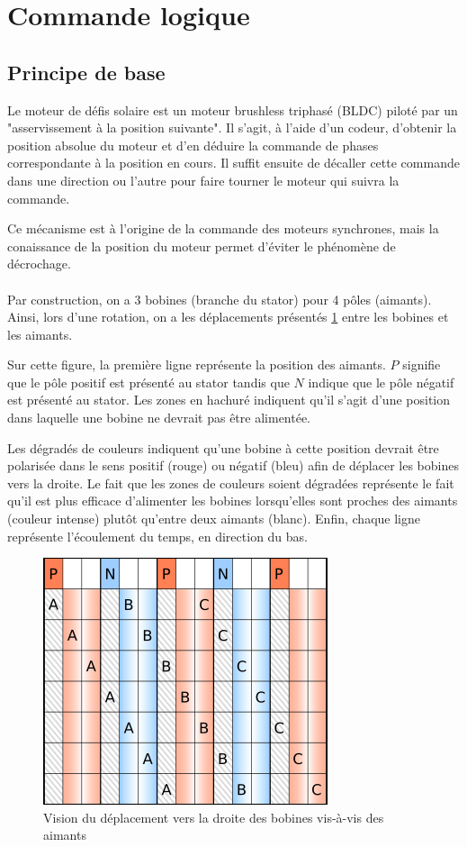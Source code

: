 \section{Commande logique}
\subsection{Principe de base}
\label{seq:cmd_principes_base}
Le moteur de défis solaire est un moteur brushless triphasé (BLDC) piloté par un "asservissement à la position suivante".
Il s'agit, à l'aide d'un codeur, d'obtenir la position absolue du moteur et d'en déduire la commande de phases correspondante à la position en cours.
Il suffit ensuite de décaller cette commande dans une direction ou l'autre pour faire tourner le moteur qui suivra la commande.

Ce mécanisme est à l'origine de la commande des moteurs synchrones, mais la conaissance de la position du moteur permet d'éviter le phénomène de décrochage.

\paragraph{}
Par construction, on a 3 bobines (branche du stator) pour 4 pôles (aimants). Ainsi, lors d'une rotation, on a les déplacements présentés 
\cref{fig:bobines_vs_aimants} entre les bobines et les aimants.

Sur cette figure, la première ligne représente la position des aimants. $P$ signifie que le pôle positif est présenté au stator tandis que $N$ indique que le pôle négatif est présenté au stator.
Les zones en hachuré indiquent qu'il s'agit d'une position dans laquelle une bobine ne devrait pas être alimentée.

Les dégradés de couleurs indiquent qu'une bobine à cette position devrait être polarisée dans le sens positif (rouge) ou négatif (bleu) afin de déplacer les bobines vers la droite.
Le fait que les zones de couleurs soient dégradées représente le fait qu'il est plus efficace d'alimenter les bobines lorsqu'elles sont proches des aimants (couleur intense) plutôt qu'entre deux aimants (blanc).
Enfin, chaque ligne représente l'écoulement du temps, en direction du bas.

\begin{figure}[h]
    \centering
    \includegraphics{png/phases_aimants_switching.png}
    \caption{Vision du déplacement vers la droite des bobines vis-à-vis des aimants}
    \label{fig:bobines_vs_aimants}
\end{figure}

